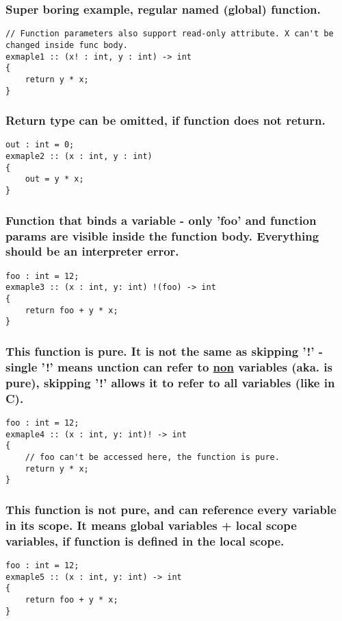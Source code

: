 \documentclass[11pt]{article}
\begin{document}
\subsubsection*{Super boring example, regular named (global) function.}
\label{sec:orgc51ab52}
\begin{verbatim}
// Function parameters also support read-only attribute. X can't be changed inside func body.
exmaple1 :: (x! : int, y : int) -> int
{
    return y * x;
}
\end{verbatim}

\subsubsection*{Return type can be omitted, if function does not return.}
\label{sec:orgbcbe79e}
\begin{verbatim}
out : int = 0;
exmaple2 :: (x : int, y : int)
{
    out = y * x;
}
\end{verbatim}

\subsubsection*{Function that binds a variable - only 'foo' and function params are visible inside the function body. Everything should be an interpreter error.}
\label{sec:org9552ed7}
\begin{verbatim}
foo : int = 12;
exmaple3 :: (x : int, y: int) !(foo) -> int
{
    return foo + y * x;
}
\end{verbatim}

\subsubsection*{This function is pure. It is not the same as skipping '!' - single '!' means unction can refer to \underline{non} variables (aka. is pure), skipping '!' allows it to refer to all variables (like in C).}
\label{sec:orgb426172}
\begin{verbatim}
foo : int = 12;
exmaple4 :: (x : int, y: int)! -> int
{
    // foo can't be accessed here, the function is pure.
    return y * x;
}
\end{verbatim}

\subsubsection*{This function is not pure, and can reference every variable in its scope. It means global variables + local scope variables, if function is defined in the local scope.}
\label{sec:orgd740bd6}
\begin{verbatim}
foo : int = 12;
exmaple5 :: (x : int, y: int) -> int
{
    return foo + y * x;
}
\end{verbatim}
\end{document}
